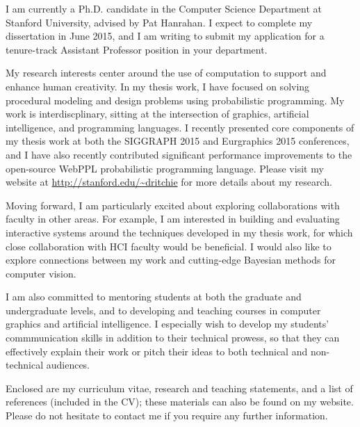 \documentclass[10pt,stdletter,dateno,sigleft]{newlfm} %
\begin{document}
\begin{newlfm}


I am currently a Ph.D. candidate in the Computer Science Department at Stanford University, advised by Pat Hanrahan. I expect to complete my dissertation in June 2015, and I am writing to submit my application for a tenure-track Assistant Professor position in your department.

My research interests center around the use of computation to support and enhance human creativity.
In my thesis work, I have focused on solving procedural modeling and design problems using probabilistic programming.
My work is interdiscplinary, sitting at the intersection of graphics, artificial intelligence, and programming languages.
I recently presented core components of my thesis work at both the SIGGRAPH 2015 and Eurgraphics 2015 conferences, and I have also recently contributed significant performance improvements to the open-source WebPPL probabilistic programming language.
Please visit my website at \url{http://stanford.edu/~dritchie} for more details about my research.

Moving forward, I am particularly excited about exploring collaborations with faculty in other areas. For example, I am interested in building and evaluating interactive systems around the techniques developed in my thesis work, for which close collaboration with HCI faculty would be beneficial. I would also like to explore connections between my work and cutting-edge Bayesian methods for computer vision.

I am also committed to mentoring students at both the graduate and undergraduate levels, and to developing and teaching courses in computer graphics and artificial intelligence. I especially wish to develop my students' commmunication skills in addition to their technical prowess, so that they can effectively explain their work or pitch their ideas to both technical and non-technical audiences.

Enclosed are my curriculum vitae, research and teaching statements, and a list of references (included in the CV); these materials can also be found on my website. Please do not hesitate to contact me if you require any further information.


\end{newlfm}
\end{document}
